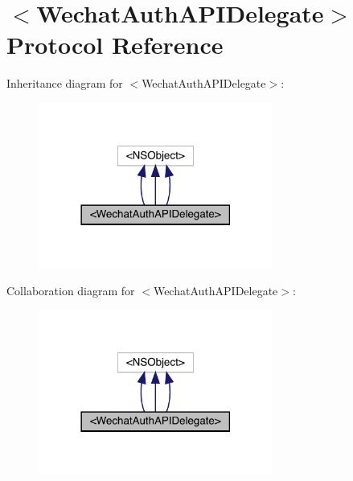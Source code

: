 \hypertarget{protocol_wechat_auth_a_p_i_delegate-p}{}\section{$<$Wechat\+Auth\+A\+P\+I\+Delegate$>$ Protocol Reference}
\label{protocol_wechat_auth_a_p_i_delegate-p}


Inheritance diagram for $<$Wechat\+Auth\+A\+P\+I\+Delegate$>$\+:\nopagebreak
\begin{figure}[H]
\begin{center}
\leavevmode
\includegraphics[width=218pt]{protocol_wechat_auth_a_p_i_delegate-p__inherit__graph}
\end{center}
\end{figure}


Collaboration diagram for $<$Wechat\+Auth\+A\+P\+I\+Delegate$>$\+:\nopagebreak
\begin{figure}[H]
\begin{center}
\leavevmode
\includegraphics[width=218pt]{protocol_wechat_auth_a_p_i_delegate-p__coll__graph}
\end{center}
\end{figure}

